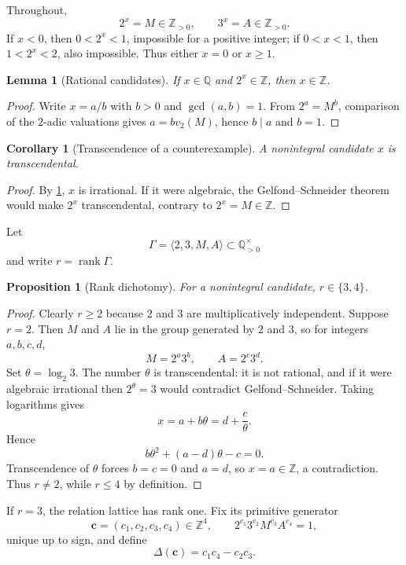 \documentclass[11pt]{article}
\newtheorem{proposition}[theorem]{Proposition}
\newtheorem{lemma}[theorem]{Lemma}
\newtheorem{corollary}[theorem]{Corollary}
\theoremstyle{definition}
\theoremstyle{remark}
\newcommand{\Q}{\mathbb{Q}}
\newcommand{\Z}{\mathbb{Z}}
\newcommand{\rank}{\operatorname{rank}}
\begin{document}
Throughout,
\[
        2^x=M\in\Z_{>0},\qquad 3^x=A\in\Z_{>0}.
\]
If $x<0$, then $0<2^x<1$, impossible for a positive integer; if $0<x<1$, then
$1<2^x<2$, also impossible.  Thus either $x=0$ or $x\ge1$.

\begin{lemma}[Rational candidates]\label{lem:rational}
If $x\in\Q$ and $2^x\in\Z$, then $x\in\Z$.
\end{lemma}
\begin{proof}
Write $x=a/b$ with $b>0$ and $\gcd(a,b)=1$.  From $2^a=M^b$, comparison of the
$2$-adic valuations gives $a=bv_2(M)$, hence $b\mid a$ and $b=1$.
\end{proof}

\begin{corollary}[Transcendence of a counterexample]\label{cor:trans}
A nonintegral candidate $x$ is transcendental.
\end{corollary}
\begin{proof}
By \cref{lem:rational}, $x$ is irrational.  If it were algebraic, the
Gelfond--Schneider theorem would make $2^x$ transcendental, contrary to $2^x=M\in\Z$.
\end{proof}

Let
\[
   \Gamma=\langle 2,3,M,A\rangle\subset\Q_{>0}^{\times}
\]
and write $r=\rank\Gamma$.

\begin{proposition}[Rank dichotomy]\label{prop:rankdichotomy}
For a nonintegral candidate, $r\in\{3,4\}$.
\end{proposition}
\begin{proof}
Clearly $r\ge2$ because $2$ and $3$ are multiplicatively independent.  Suppose $r=2$.
Then $M$ and $A$ lie in the group generated by $2$ and $3$, so for integers
$a,b,c,d$,
\[
       M=2^a3^b,\qquad A=2^c3^d.
\]
Set $\theta=\log_2 3$.  The number $\theta$ is transcendental: it is not rational,
and if it were algebraic irrational then $2^\theta=3$ would contradict
Gelfond--Schneider.  Taking logarithms gives
\[
       x=a+b\theta=d+\frac{c}{\theta}.
\]
Hence
\[
       b\theta^2+(a-d)\theta-c=0.
\]
Transcendence of $\theta$ forces $b=c=0$ and $a=d$, so $x=a\in\Z$, a contradiction.
Thus $r\ne2$, while $r\le4$ by definition.
\end{proof}

If $r=3$, the relation lattice has rank one.  Fix its primitive generator
\[
  \bm c=(c_1,c_2,c_3,c_4)\in\Z^4,
  \qquad
  2^{c_1}3^{c_2}M^{c_3}A^{c_4}=1,
\]
unique up to sign, and define
\[
       \Delta(\bm c)=c_1c_4-c_2c_3.
\]
\end{document}
